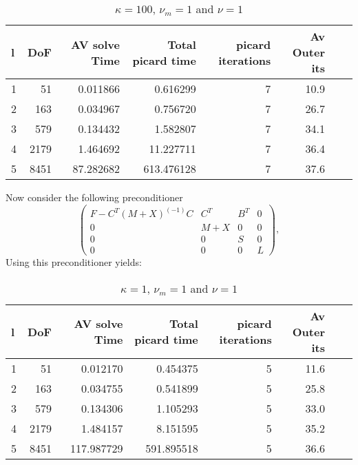 \documentclass{article}
\begin{document}
\begin{table}[h!]
\begin{tabular}{lrrrrrll}
\hline
 l &   DoF &  AV solve Time &  Total picard time &  picard iterations & Av Outer its \\
\hline
 1 &    51 &       0.011866 &           0.616299 &                  7 &         10.9  \\
 2 &   163 &       0.034967 &           0.756720 &                  7 &         26.7  \\
 3 &   579 &       0.134432 &           1.582807 &                  7 &         34.1  \\
 4 &  2179 &       1.464692 &          11.227711 &                  7 &         36.4  \\
 5 &  8451 &      87.282682 &         613.476128 &                  7 &         37.6  \\
\hline
\end{tabular}
\caption{$\kappa = 100$, $\nu_m = 1$ and $\nu=1$}
\end{table}


Now consider the following preconditioner
\begin{equation}
    \begin{pmatrix}
        F - C^T(M+X)^(-1)C& C^T & B^T & 0 \\
        0 & M+X& 0 & 0 \\
        0 & 0 & S & 0 \\
        0 & 0 & 0 & L
    \end{pmatrix},
\end{equation}
Using this preconditioner yields:
\begin{table}[h!]
\begin{tabular}{lrrrrrll}
\hline
 l &   DoF &  AV solve Time &  Total picard time &  picard iterations & Av Outer its \\
\hline
1 &    51 &       0.012170 &           0.454375 &                  5 &         11.6\\
2 &   163 &       0.034755 &           0.541899 &                  5 &         25.8\\
3 &   579 &       0.134306 &           1.105293 &                  5 &         33.0\\
4 &  2179 &       1.484157 &           8.151595 &                  5 &         35.2\\
5 &  8451 &     117.987729 &         591.895518 &                  5 &         36.6\\
\hline
\end{tabular}
\caption{$\kappa = 1$, $\nu_m = 1$ and $\nu=1$}
\end{table}
\end{document}
